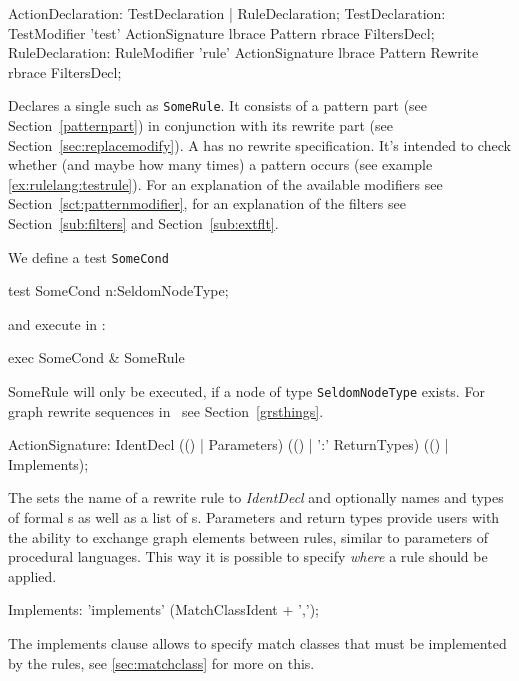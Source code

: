 \begin{rail}
  ActionDeclaration: TestDeclaration | RuleDeclaration;
  TestDeclaration: TestModifier 'test' ActionSignature lbrace Pattern rbrace FiltersDecl;
  RuleDeclaration: RuleModifier 'rule' ActionSignature lbrace Pattern Rewrite rbrace FiltersDecl;
\end{rail}
Declares a single  such as \texttt{SomeRule}.
It consists of a pattern part (see Section~\ref{patternpart}) in conjunction with its rewrite part (see Section~\ref{sec:replacemodify}).
A  has no rewrite specification.
It's intended to check whether (and maybe how many times) a pattern occurs (see example \ref{ex:rulelang:testrule}).
For an explanation of the available modifiers see Section~\ref{sct:patternmodifier},
for an explanation of the filters see Section~\ref{sub:filters} and Section~\ref{sub:extflt}.


\begin{example}
\label{ex:rulelang:testrule}
We define a test \texttt{SomeCond}
\begin{grgen}
test SomeCond {
  n:SeldomNodeType;
}
\end{grgen}
and execute in \GrShell:
\begin{grshell}
  exec SomeCond & SomeRule
\end{grshell}
SomeRule will only be executed, if a node of type \texttt{SeldomNodeType} exists.
For graph rewrite sequences in \GrShell\ see Section~\ref{grsthings}.
\end{example}

\begin{rail}
  ActionSignature: IdentDecl (() | Parameters) (() | ':' ReturnTypes) (() | Implements);
\end{rail}
The  sets the name of a rewrite rule to \emph{IdentDecl} and optionally names and types of formal s as well as a list of s.
Parameters and return types provide users with the ability to exchange graph elements between rules, similar to parameters of procedural languages.
This way it is possible to specify \emph{where} a rule should be applied.

\begin{rail}
  Implements: 'implements' (MatchClassIdent + ',');
\end{rail}
The implements clause allows to specify match classes that must be implemented by the rules, see \ref{sec:matchclass} for more on this.

